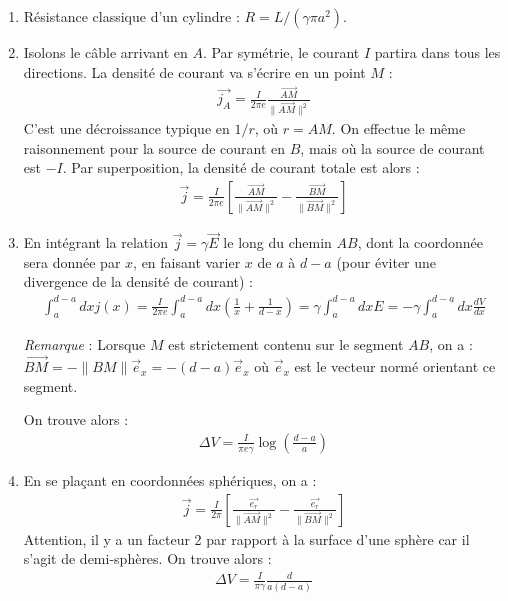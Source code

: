 \begin{correction}

\begin{enumerate}

	\item Résistance classique d'un cylindre : $R=L/(\gamma\pi a^2)$.
	
	\item Isolons le câble arrivant en $A$. Par symétrie, le courant $I$ partira dans tous les directions. La densité de courant va s'écrire en un point $M$ :
	\begin{align*}
		\vec{j_A}=\frac{I}{2\pi e }\frac{\vec{AM}}{\|\vec{AM} \|^2}
	\end{align*}
	C'est une décroissance typique en $1/r$, où $r=AM$.
	On effectue le même raisonnement pour la source de courant en $B$, mais où la source de courant est $-I$. Par superposition, la densité de courant totale est alors :
	\begin{align*}
		\vec{j}=\frac{I}{2\pi e }\left[ \frac{\vec{AM}}{\|\vec{AM} \|^2} - \frac{\vec{BM}}{\|\vec{BM} \|^2}\right] 
	\end{align*}
	
	\item En intégrant la relation $\vec{j}=\gamma\vec{E}$ le long du chemin $AB$, dont la coordonnée sera donnée par $x$, en faisant varier $x$ de $a$ à $d-a$ (pour éviter une divergence de la densité de courant) :
	\begin{align*}
		\int_a^{d-a}dx j(x)=\frac{I}{2\pi e}\int_a^{d-a}dx\left(\frac{1}{x}+\frac{1}{d-x} \right) =\gamma\int_a^{d-a}dxE=-\gamma\int_a^{d-a}dx\frac{dV}{dx}
	\end{align*}
	
	\textit{Remarque} : Lorsque $M$ est strictement contenu sur le segment $AB$, on a : $\vec{BM} = -\|BM\|\vec{e}_x=-(d-a)\vec{e}_x$ où $\vec{e}_x$ est le vecteur normé orientant ce segment. 
	
	On trouve alors :
	\begin{align*}
		\Delta V = \frac{I}{\pi e\gamma}\log\left(\frac{d-a}{a} \right) 
	\end{align*}

	\item En se plaçant en coordonnées sphériques, on a :
	\begin{align*}
		\vec{j}=\frac{I}{2\pi}\left[ \frac{\vec{e_r}}{\|\vec{AM} \|^2} - \frac{\vec{e_r}}{\|\vec{BM} \|^2}\right] 
	\end{align*}
	Attention, il y a un facteur 2 par rapport à la surface d'une sphère car il s'agit de demi-sphères.
		On trouve alors :
	\begin{align*}
		\Delta V = \frac{I}{\pi \gamma}\frac{d}{a(d-a)}
	\end{align*}
	
\end{enumerate}

\end{correction}

